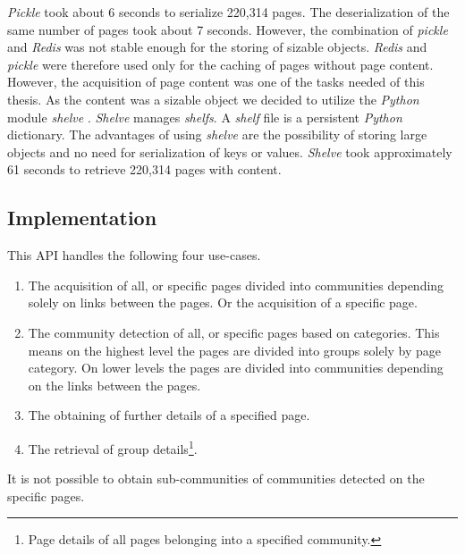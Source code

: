\textit{Pickle} took about 6 seconds to serialize 220,314 pages. The deserialization of the same number of pages took about 7 seconds. However, the combination of \textit{pickle} and \textit{Redis} was not stable enough for the storing of sizable objects. \textit{Redis} and \textit{pickle} were therefore used only for the caching of pages without page content. However, the acquisition of page content was one of the tasks needed of this thesis. As the content was a sizable object we decided to utilize the \textit{Python} module \textit{shelve} \cite{shelve}. \textit{Shelve} manages \textit{shelfs}. A \textit{shelf} file is a persistent \textit{Python} dictionary. The advantages of using \textit{shelve} are the possibility of storing large objects and no need for serialization of keys or values. \textit{Shelve} took approximately 61 seconds to retrieve 220,314 pages with content. 



\subsection{Implementation} \label{APIImplementation}
This API handles the following four use-cases. 
\begin{enumerate}
    \item The acquisition of all, or specific pages divided into communities depending solely on links between the pages. Or the acquisition of a specific page.
    \item  The community detection of all, or specific pages based on categories. This means on the highest level the pages are divided into groups solely by page category. On lower levels the pages are divided into communities depending on the links between the pages.
    \item The obtaining of further details of a specified page.
    \item The retrieval of group details\footnote{Page details of all pages belonging into a specified community.}. 
\end{enumerate} 
It is not possible to obtain sub-communities of communities detected on the specific pages.

